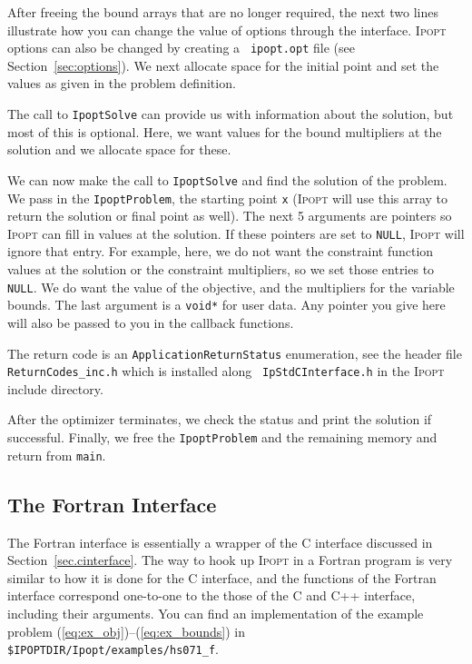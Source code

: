 \documentclass[10pt]{article}
\newcommand{\Ipopt}{\textsc{Ipopt}\xspace}
\begin{document}
After freeing the bound arrays that are no longer required, the next
two lines illustrate how you can change the value of options through
the interface.  \Ipopt options can also be changed by creating a {\tt
ipopt.opt} file (see Section~\ref{sec:options}). We next allocate
space for the initial point and set the values as given in the problem
definition.

The call to {\tt IpoptSolve} can provide us with information about the
solution, but most of this is optional. Here, we want values for the
bound multipliers at the solution and we allocate space for these.

We can now make the call to {\tt IpoptSolve} and find the solution of
the problem. We pass in the {\tt IpoptProblem}, the starting point
{\tt x} (\Ipopt will use this array to return the solution or final
point as well).  The next 5 arguments are pointers so \Ipopt can fill
in values at the solution.  If these pointers are set to {\tt NULL},
\Ipopt will ignore that entry.  For example, here, we do not want the
constraint function values at the solution or the constraint
multipliers, so we set those entries to {\tt NULL}. We do want the
value of the objective, and the multipliers for the variable bounds.
The last argument is a {\tt void*} for user data. Any pointer you give
here will also be passed to you in the callback functions.

The return code is an {\tt ApplicationReturnStatus} enumeration, see
the header file {\tt ReturnCodes\_inc.h} which is installed along {\tt
  IpStdCInterface.h} in the \Ipopt include directory.

After the optimizer terminates, we check the status and print the
solution if successful. Finally, we free the {\tt IpoptProblem} and
the remaining memory and return from {\tt main}.

\subsection{The Fortran Interface}

The Fortran interface is essentially a wrapper of the C interface
discussed in Section~\ref{sec.cinterface}.  The way to hook up \Ipopt
in a Fortran program is very similar to how it is done for the C
interface, and the functions of the Fortran interface correspond
one-to-one to the those of the C and C++ interface, including their
arguments.  You can find an implementation of the example problem
(\ref{eq:ex_obj})--(\ref{eq:ex_bounds}) in {\tt
  \$IPOPTDIR/Ipopt/examples/hs071\_f}.
\end{document}
